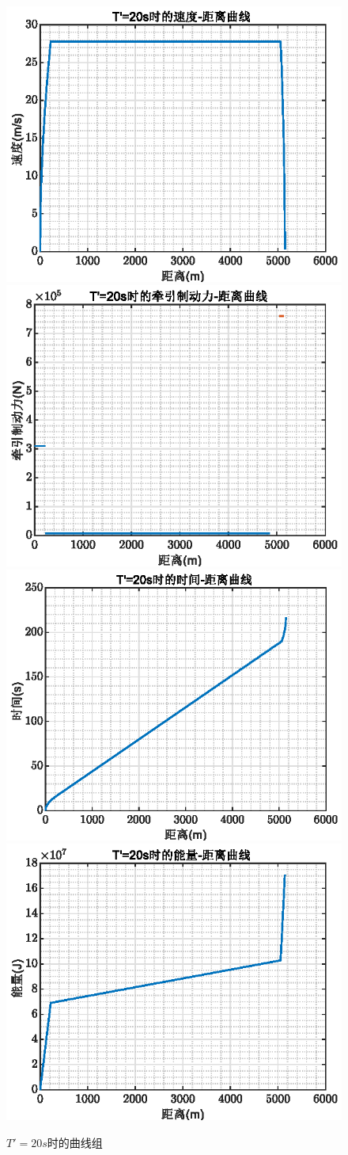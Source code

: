 \documentclass[12pt,a4paper]{nmmcm}
\begin{document}
\begin{figure}[H]
\centering
\includegraphics[width=.49\textwidth,height=0.3\textwidth]{figures/20a.eps}
\includegraphics[width=.49\textwidth,height=0.3\textwidth]{figures/20b.eps}
\includegraphics[width=.49\textwidth,height=0.3\textwidth]{figures/20c.eps}
\includegraphics[width=.49\textwidth,height=0.3\textwidth]{figures/20d.eps}
\caption{\song\wuhao $T'=20s$时的曲线组}
\end{figure}
\end{document}

